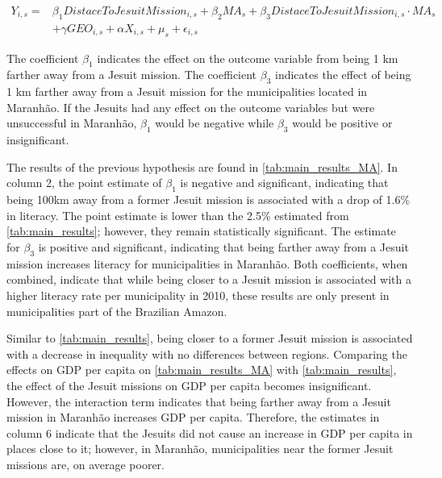 \documentclass{article}
\begin{document}
\begin{equation}
\label{eqn:Maranhão}
\begin{split}
	Y_{i,s} = & \beta_1 \textit{DistaceToJesuitMission}_{i,s} + \beta_2 \textit{MA}_{s} + \beta_3 \textit{DistaceToJesuitMission}_{i,s} \cdot \textit{MA}_{s} \\ & + \gamma \textit{GEO}_{i,s} +  \alpha \textit{X}_{i,s} + \mu_s +  \epsilon_{i,s}
\end{split}
\end{equation}

The coefficient $\beta_1$ indicates the effect on the outcome variable from being 1 km farther away from a Jesuit mission. 
The coefficient $\beta_3$ indicates the effect of being 1 km farther away from a Jesuit mission for the municipalities located in Maranhão. 
If the Jesuits had any effect on the outcome variables but were unsuccessful in Maranhão,  $\beta_1$ would be negative while $\beta_3$ would be positive or insignificant.

The results of the previous hypothesis are found in \autoref{tab:main_results_MA}. 
In column 2, the point estimate of $\beta_1$ is negative and significant, indicating that being 100km away from a former Jesuit mission is associated with a drop of 1.6\% in literacy. 
The point estimate is lower than the 2.5\% estimated from \autoref{tab:main_results}; however, they remain statistically significant.
The estimate for $\beta_3$ is positive and significant, indicating that being farther away from a Jesuit mission increases literacy for municipalities in Maranhão. 
Both coefficients, when combined, indicate that while being closer to a Jesuit mission is associated with a higher literacy rate per municipality in 2010, these results are only present in municipalities part of the Brazilian Amazon.


Similar to \autoref{tab:main_results}, being closer to a former Jesuit mission is associated with a decrease in inequality with no differences between regions. 
Comparing the effects on GDP per capita on \autoref{tab:main_results_MA} with  \autoref{tab:main_results}, the effect of the Jesuit missions on GDP per capita becomes insignificant. 
However, the interaction term indicates that being farther away from a Jesuit mission in Maranhão increases GDP per capita. 
Therefore, the estimates in column 6 indicate that the Jesuits did not cause an increase in GDP per capita in places close to it; however, in  Maranhão, municipalities near the former Jesuit missions are, on average poorer. 
\end{document}
